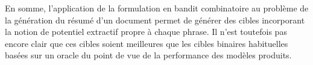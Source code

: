 En somme, l'application de la formulation en bandit combinatoire au problème 
de la génération du résumé d'un document permet de générer des cibles 
incorporant la notion de potentiel extractif propre à chaque phrase.
Il n'est toutefois pas encore clair que ces cibles soient meilleures 
que les cibles binaires habituelles basées sur un oracle du point de vue 
de la performance des modèles produits.